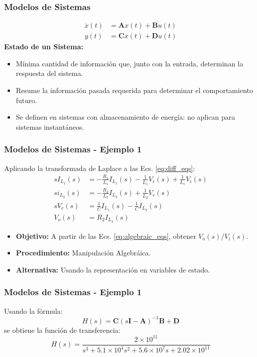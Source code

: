\documentclass[aspectratio=169,handout]{beamer}
\theoremstyle{definition}
\theoremstyle{plain}
\theoremstyle{remark}
\begin{document}
\begin{frame}[<+->]\frametitle{Modelos de Sistemas}
  \begin{align*}
    \dot{x}(t) &= \mathbf{A} x(t) + \mathbf{B}u(t)\\
    y(t) &= \mathbf{C}x(t) + \mathbf{D}u(t)
  \end{align*}
\textbf{Estado de un Sistema:}
\begin{itemize}
  \item Mínima cantidad de información que, junto con la entrada, determinan la respuesta del sistema.
  \item Resume la información pasada requerida para determinar el comportamiento futuro.
  \item Se definen en sistemas con almacenamiento de energía: no aplican para sistemas instantáneos.
\end{itemize}
\end{frame}

\begin{frame}[<+->]\frametitle{Modelos de Sistemas - Ejemplo 1}
Aplicando la transformada de Laplace a las Ecs. \eqref{eq:diff_eqs}:
\begin{subequations}\label{eq:algebraic_eqs}
\begin{align}
  s I_{L_1}(s) &= -\frac{R_1}{L_1}I_{L_1}(s) - \frac{1}{L_1} V_c(s) + \frac{1}{L_1} V_i(s) \\
  s i_{L_2}(s) &= -\frac{R_2}{L_2}I_{L_2}(s) + \frac{1}{L_2} V_c(s) \\
  s V_c(s) &= \frac{1}{C}I_{L_1}(s) - \frac{1}{C}I_{L_2}(s)\\
  V_o(s) &= R_2 I_{L_2}(s)
\end{align}
\end{subequations}
\vspace*{-5mm}
\begin{itemize}
  \item \textbf{Objetivo:} A partir de las Ecs. \eqref{eq:algebraic_eqs}, obtener $V_o(s)/V_i(s)$.
  \item \textbf{Procedimiento:} Manipulación Algebráica.
  \item \textbf{Alternativa:} Usando la representación en variables de estado.
\end{itemize}
\end{frame}

\begin{frame}[<-+>]\frametitle{Modelos de Sistemas - Ejemplo 1}
  Usando la fórmula:
  \begin{equation}
    H(s) = \mathbf{C}(s\mathbf{I}-\mathbf{A})^{-1}\mathbf{B} + \mathbf{D}
  \end{equation}
  se obtiene la función de transferencia:
  \begin{equation}
    H(s) = \frac{2\times10^{11}}{s^3 + 5.1\times10^4 s^2 + 5.6\times10^7 s + 2.02\times10^{11}}
  \end{equation}
\end{frame}
\end{document}
